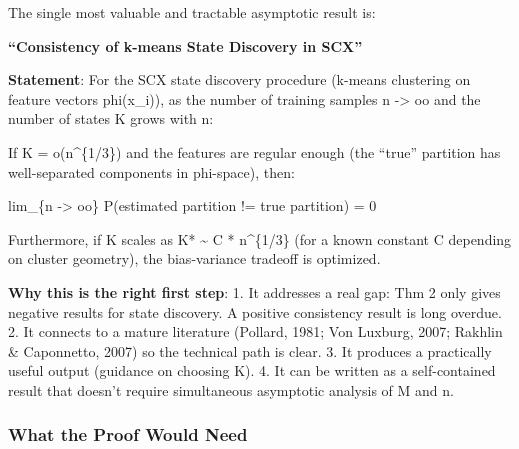 \documentclass[
  12pt,
]{ctexart}
\begin{document}
The single most valuable and tractable asymptotic result is:

\textbf{``Consistency of k-means State Discovery in SCX''}

\textbf{Statement}: For the SCX state discovery procedure (k-means
clustering on feature vectors phi(x\_i)), as the number of training
samples n -\textgreater{} oo and the number of states K grows with n:

If K = o(n\^{}\{1/3\}) and the features are regular enough (the ``true''
partition has well-separated components in phi-space), then:

lim\_\{n -\textgreater{} oo\} P(estimated partition != true partition) =
0

Furthermore, if K scales as K* \textasciitilde{} C * n\^{}\{1/3\} (for a
known constant C depending on cluster geometry), the bias-variance
tradeoff is optimized.

\textbf{Why this is the right first step}: 1. It addresses a real gap:
Thm 2 only gives negative results for state discovery. A positive
consistency result is long overdue. 2. It connects to a mature
literature (Pollard, 1981; Von Luxburg, 2007; Rakhlin \& Caponnetto,
2007) so the technical path is clear. 3. It produces a practically
useful output (guidance on choosing K). 4. It can be written as a
self-contained result that doesn't require simultaneous asymptotic
analysis of M and n.

\subsubsection{What the Proof Would
Need}\label{what-the-proof-would-need}
\end{document}
